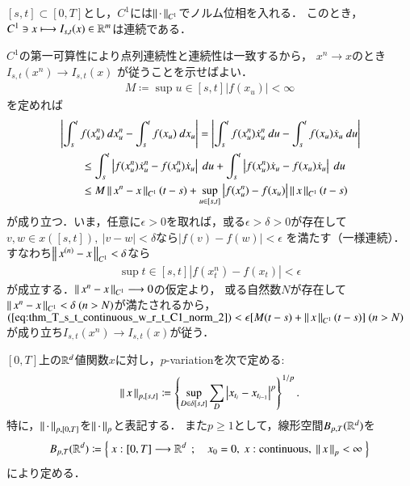 \begin{screen}
	\begin{thm}\label{thm:T_s_t_continuous_w_r_t_C1_norm}
		$[s,t] \subset [0,T]$とし，$C^1$には$\left\|\, \cdot\, \right\|_{C^1}$でノルム位相を入れる．
		このとき，$C^1 \ni x \longmapsto I_{s,t}(x) \in \mathbb{R}^m$は連続である．
	\end{thm}
\end{screen}

\begin{prf}
	$C^1$の第一可算性により点列連続性と連続性は一致するから，
	$x^n \longrightarrow x$のとき$I_{s,t}(x^n) \longrightarrow I_{s,t}(x)$
	が従うことを示せばよい．
	\begin{align}
		M \coloneqq \sup{u \in [s,t]}{|f(x_u)|} < \infty
	\end{align}
	を定めれば
	\begin{align}
		&\left| \int_s^t f(x^n_u)\ dx^n_u
			- \int_s^t f(x_u)\ dx_u \right|
		= \left| \int_s^t f(x^n_u)\dot{x}^n_u\ du
			- \int_s^t f(x_u)\dot{x}_u\ du \right| \\
		&\qquad \leq \int_s^t \left| f(x^n_u)\dot{x}^n_u - f(x^n_u)\dot{x}_u \right|\ du
			+ \int_s^t \left| f(x^n_u)\dot{x}_u - f(x_u)\dot{x}_u \right|\ du \\
		&\qquad \leq M \left\|\, x^n - x\, \right\|_{C^1} (t-s)
			+ \operatorname*{sup}_{u \in [s,t]} \left| f(x^n_u) - f(x_u) \right| \left\|\, x\, \right\|_{C^1}(t-s)
			\label{eq:thm_T_s_t_continuous_w_r_t_C1_norm_2}
	\end{align}
	が成り立つ．いま，任意に$\epsilon > 0$を取れば，或る$\epsilon > \delta > 0$が存在して
	$v,w \in x([s,t]),\ |v - w| < \delta$なら$|f(v) - f(w)| < \epsilon$
	を満たす（一様連続）．すなわち$\left\|\, x^{(n)} - x\, \right\|_{C^1} < \delta$なら
	\begin{align}
		\sup{t \in [s,t]}{\left|f(x^n_t) - f(x_t) \right|} < \epsilon
	\end{align}
	が成立する．$\left\|\, x^n - x\, \right\|_{C^1} \longrightarrow 0$の仮定より，
	或る自然数$N$が存在して$\left\|\, x^n - x\, \right\|_{C^1} < \delta\ (n > N)$が満たされるから，
	$(\refeq{eq:thm_T_s_t_continuous_w_r_t_C1_norm_2}) < \epsilon[M(t-s) + \Norm{x}{C^1}(t-s)]\ (n > N)$
	が成り立ち$I_{s,t}(x^n) \longrightarrow I_{s,t}(x)$が従う．
	\QED
\end{prf}

\begin{screen}
	\begin{dfn}[$p$-variation]
		$[0,T]$上の$\mathbb{R}^d$値関数$x$に対し，$p$-variationを次で定める:
		\begin{align}
			\left\|\, x\, \right\|_{p,[s,t]}
			\coloneqq \left\{ \operatorname*{sup}_{D \in \delta[s,t]} \sum_{D} 
				\left| x_{t_i} - x_{t_{i-1}} \right|^p \right\}^{1/p}.
		\end{align}
		特に，$\left\|\, \cdot\, \right\|_{p,[0,T]}$を$\left\|\, \cdot\, \right\|_{p}$と表記する．
		また$p \geq 1$として，線形空間$B_{p,T}(\mathbb{R}^d)$を
		\begin{align}
			B_{p,T}(\R^d)
			\coloneqq \Set{x:[0,T] \longrightarrow \R^d}{x_0=0,\ x:\mbox{continuous},\ \Norm{x}{p} < \infty}
		\end{align}
		により定める．
	\end{dfn}
\end{screen}

